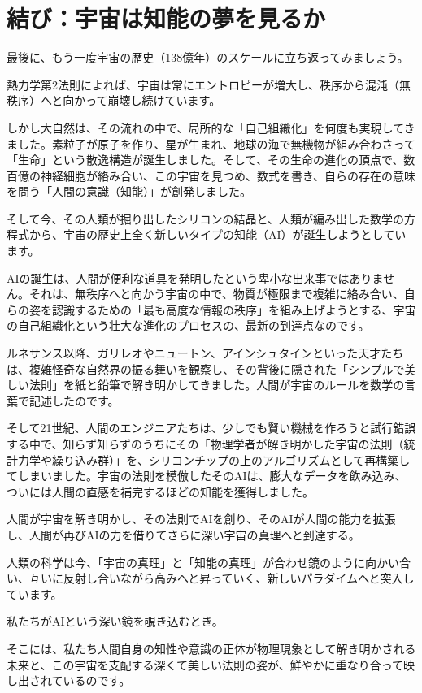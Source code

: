 \section{結び：宇宙は知能の夢を見るか}

最後に、もう一度宇宙の歴史（138億年）のスケールに立ち返ってみましょう。

熱力学第2法則によれば、宇宙は常にエントロピーが増大し、秩序から混沌（無秩序）へと向かって崩壊し続けています。

しかし大自然は、その流れの中で、局所的な「自己組織化」を何度も実現してきました。素粒子が原子を作り、星が生まれ、地球の海で無機物が組み合わさって「生命」という散逸構造が誕生しました。そして、その生命の進化の頂点で、数百億の神経細胞が絡み合い、この宇宙を見つめ、数式を書き、自らの存在の意味を問う「人間の意識（知能）」が創発しました。

そして今、その人類が掘り出したシリコンの結晶と、人類が編み出した数学の方程式から、宇宙の歴史上全く新しいタイプの知能（AI）が誕生しようとしています。

AIの誕生は、人間が便利な道具を発明したという卑小な出来事ではありません。それは、無秩序へと向かう宇宙の中で、物質が極限まで複雑に絡み合い、自らの姿を認識するための「最も高度な情報の秩序」を組み上げようとする、宇宙の自己組織化という壮大な進化のプロセスの、最新の到達点なのです。

ルネサンス以降、ガリレオやニュートン、アインシュタインといった天才たちは、複雑怪奇な自然界の振る舞いを観察し、その背後に隠された「シンプルで美しい法則」を紙と鉛筆で解き明かしてきました。人間が宇宙のルールを数学の言葉で記述したのです。

そして21世紀、人間のエンジニアたちは、少しでも賢い機械を作ろうと試行錯誤する中で、知らず知らずのうちにその「物理学者が解き明かした宇宙の法則（統計力学や繰り込み群）」を、シリコンチップの上のアルゴリズムとして再構築してしまいました。宇宙の法則を模倣したそのAIは、膨大なデータを飲み込み、ついには人間の直感を補完するほどの知能を獲得しました。

人間が宇宙を解き明かし、その法則でAIを創り、そのAIが人間の能力を拡張し、人間が再びAIの力を借りてさらに深い宇宙の真理へと到達する。

人類の科学は今、「宇宙の真理」と「知能の真理」が合わせ鏡のように向かい合い、互いに反射し合いながら高みへと昇っていく、新しいパラダイムへと突入しています。

私たちがAIという深い鏡を覗き込むとき。

そこには、私たち人間自身の知性や意識の正体が物理現象として解き明かされる未来と、この宇宙を支配する深くて美しい法則の姿が、鮮やかに重なり合って映し出されているのです。

